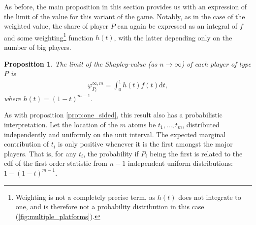 \documentclass[a4paper]{article}
\newtheorem{proposition}{Proposition}
\newcommand{\dt}{\mathrm{d}t}
\begin{document}
As before, the main proposition in this section provides us with an expression of the limit of the value for this variant of the game.
Notably, as in the case of the weighted value, the share of player $P$ can again be expressed as an integral of $f$ and some weighting\footnote{
    Weighting is not a completely precise term, as $h(t)$ does not integrate to one, and is therefore not a probability distribution in this case (\cref{fig:multiple_platforms}).
} function $h(t)$, with the latter depending only on the number of big players.
\begin{proposition}
    \label{prop:multiple_platforms}
    The limit of the Shapley-value (as $n \to \infty$) of each player of type $P$ is
    \begin{align*}
        \varphi_{P_i}^{\infty, m} = \int_0^1 h(t) f(t) \dt,
    \end{align*}
    where $h(t) = (1-t) ^ {m-1}$.
\end{proposition}

As with proposition \ref{prop:one_sided}, this result also has a probabilistic interpretation.
Let the location of the $m$ atoms be $t_1, \dots, t_m$, distributed independently and uniformly on the unit interval.
The expected marginal contribution of $t_i$ is only positive whenever it is the first amongst the major players.
That is, for any $t_i$, the probability if $P_i$ being the first is related to the cdf of the first order statistic from $n-1$ independent uniform distributions: $1 - (1-t)^{m-1}$.
\end{document}
